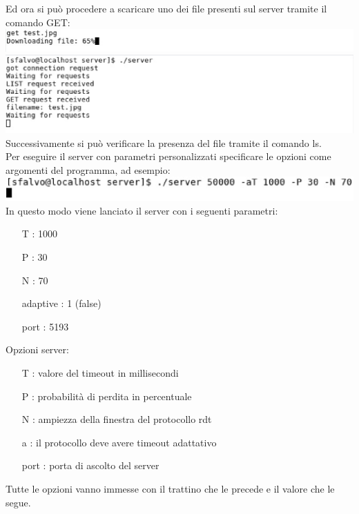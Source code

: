 Ed ora si può procedere a scaricare uno dei file presenti sul server
tramite il comando GET:\\
\includegraphics[scale=0.5]{images/esempio/cli_get}\\
\includegraphics[scale=0.5]{images/esempio/srv_resp}\\
Successivamente si può verificare la presenza del file tramite il comando ls.\\
Per eseguire il server con parametri personalizzati specificare le opzioni
come argomenti del programma, ad esempio:\\
\includegraphics[scale=0.5]{images/esempio/srv_par}\\
In questo modo viene lanciato il server con i seguenti parametri:
\begin{itemize}
\item[T]: 1000
\item[P]: 30
\item[N]: 70
\item[adaptive]: 1 (false)
\item[port]: 5193 
\end{itemize}
Opzioni server:
\begin{itemize}
\item[T]: valore del timeout in millisecondi
\item[P]: probabilità di perdita in percentuale
\item[N]: ampiezza della finestra del protocollo rdt
\item[a]: il protocollo deve avere timeout adattativo
\item[port]: porta di ascolto del server
\end{itemize}
Tutte le opzioni vanno immesse con il trattino che le precede e il valore che le segue.
